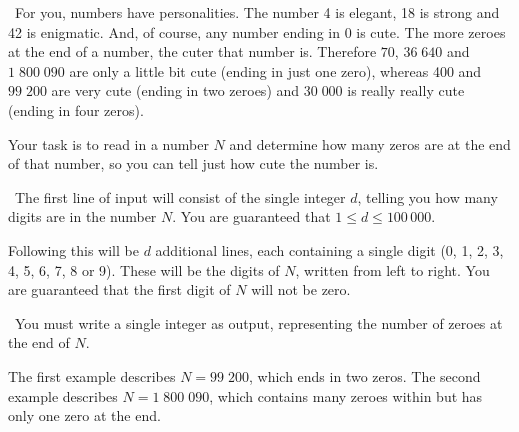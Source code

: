 

\Question\ \quad For you, numbers have personalities. The number
4 is elegant, 18 is strong and 42 is enigmatic.  And, of course, any number ending in 0 is
cute.  The more zeroes at the end of a number, the cuter that number is. Therefore $70$,
$36\;640$ and $1\;800\;090$ are only a little bit cute (ending in just one zero), whereas
400 and $99\;200$ are very cute (ending in two zeroes) and $30\;000$ is really really cute
(ending in four zeros).

Your task is to read in a number $N$ and determine how many zeros are at the end of that
number, so you can tell just how cute the number is.

\Input\ The first line of input will consist of the single integer $d$, telling you how
many digits are in the number $N$. You are guaranteed that $1 \le d \le 100\,000$.

Following this will be $d$ additional lines, each containing a single digit (0, 1, 2, 3,
4, 5, 6, 7, 8 or 9). These will be the digits of $N$, written from left to right. You are
guaranteed that the first digit of $N$ will not be zero.

\Output\ You must write a single integer as output, representing the number of zeroes at
the end of $N$.

\Sample



\Explanation The first example describes $N = 99\;200$, which ends in two zeros. The second
example describes $N = 1\;800\;090$, which contains many zeroes within but has only one zero
at the end.

